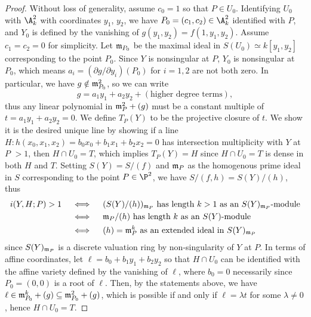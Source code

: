 \documentclass[a4paper]{article}
\begin{document}
\begin{enumerate} [label=\textbf{\arabic*.}, leftmargin=0cm]
\begin{proof}
          Without loss of generality, assume $c_0 = 1$ so that $P \in U_0$. Identifying $U_0$ with $\A_k^2$ with coordinates $y_1$, $y_2$, we have $P_0 = (c_1, c_2) \in \A_k^2$ identified with $P$, and $Y_0$ is defined by the vanishing of $g(y_1, y_2) = f(1, y_1, y_2)$. Assume $c_1 = c_2 = 0$ for simplicity. Let $\mathfrak{m}_{P_0}$ be the maximal ideal in $S(U_0) \simeq k[y_1, y_2]$ corresponding to the point $P_0$. Since $Y$ is nonsingular at $P$, $Y_0$ is nonsingular at $P_0$, which means $a_i = (\partial g / \partial y_i)(P_0)$ for $i = 1, 2$ are not both zero. In particular, we have $g \notin \mathfrak{m}_{P_0}^2$, so we can write
          \begin{equation*}
            g = a_1 y_1 + a_2 y_2 + (\text{higher degree terms}),
          \end{equation*}
          thus any linear polynomial in $\mathfrak{m}_P^2 + (g)$ must be a constant multiple of $t =  a_1 y_1 + a_2 y_2 = 0$.
          We define $T_P(Y)$ to be the projective closure of $t$.
          We show it is the desired unique line by showing if a line $H : h(x_0, x_1, x_2) = b_0 x_0 + b_1 x_1 + b_2 x_2 = 0$ has intersection multiplicity with $Y$ at $P$ $> 1$, then $H \cap U_0 = T$, which implies $T_P(Y) = H$ since $H \cap U_0 = T$ is dense in both $H$ and $T$.
          Setting $S(Y) = S/(f)$ and $\mathfrak{m}_P$ as the homogenous prime ideal in $S$ corresponding to the point $P \in \P^2$, we have $S / (f, h) = S(Y) / (h)$, thus
          \begin{align*}
            i(Y, H ; P) > 1 \quad & \iff \quad (S(Y) / (h))_{\mathfrak{m}_P} \text{ has length $k > 1$ as an $S(Y)_{\mathfrak{m}_P}$-module} \\
                                  & \iff \quad \mathfrak{m}_P / (h) \text{ has length $k$ as an $S(Y)$-module}                           \\
                                  & \iff \quad (h) = \mathfrak{m}_P^k \text{ as an extended ideal in $S(Y)_{\mathfrak{m}_P}$ }
          \end{align*}
          since $S(Y)_{\mathfrak{m}_P}$ is a discrete valuation ring by non-singularity of $Y$ at $P$. In terms of affine coordinates, let $\ell = b_0 + b_1 y_1 + b_2 y_2$ so that $H \cap U_0$ can be identified with the affine variety defined by the vanishing of $\ell$, where $b_0 = 0$ necessarily since $P_0 = (0, 0)$ is a root of $\ell$. Then, by the statements above, we have $\ell \in \mathfrak{m}_{P_0}^k + (g) \subseteq \mathfrak{m}_{P_0}^2 + (g)$, which is possible if and only if $\ell = \lambda t$ for some $\lambda \neq 0$, hence $H \cap U_0 = T$.
        \end{proof}


\end{enumerate}
\end{document}
